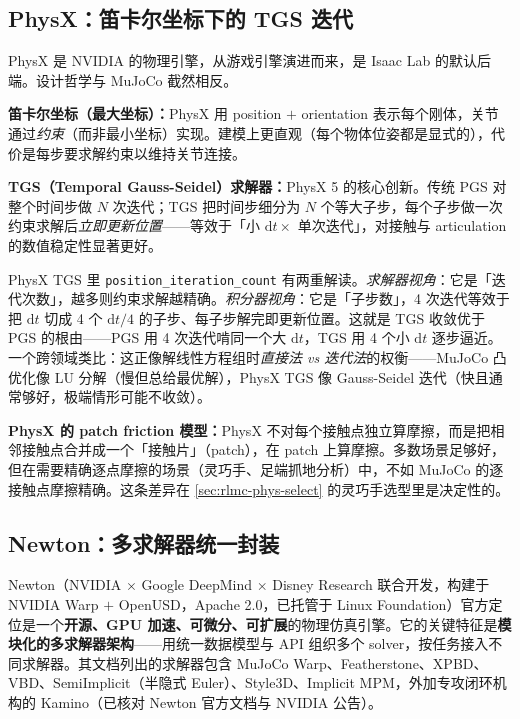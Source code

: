\subsection{PhysX：笛卡尔坐标下的 TGS 迭代}
\label{sec:rlmc-phys-physx}

PhysX 是 NVIDIA 的物理引擎，从游戏引擎演进而来，是 Isaac Lab 的默认后端。设计哲学与 MuJoCo 截然相反。

\textbf{笛卡尔坐标（最大坐标）：}PhysX 用 position $+$ orientation 表示每个刚体，关节通过\emph{约束}（而非最小坐标）实现。建模上更直观（每个物体位姿都是显式的），代价是每步要求解约束以维持关节连接。

\textbf{TGS（Temporal Gauss-Seidel）求解器：}PhysX 5 的核心创新。传统 PGS 对整个时间步做 $N$ 次迭代；TGS 把时间步细分为 $N$ 个等大子步，每个子步做一次约束求解后\emph{立即更新位置}——等效于「小 $\mathrm dt\times$ 单次迭代」，对接触与 articulation 的数值稳定性显著更好。

\begin{insight}\label{ins:rlmc-phys-tgs}
PhysX TGS 里 \verb|position_iteration_count| 有两重解读。\emph{求解器视角}：它是「迭代次数」，越多则约束求解越精确。\emph{积分器视角}：它是「子步数」，4 次迭代等效于把 $\mathrm dt$ 切成 4 个 $\mathrm dt/4$ 的子步、每子步解完即更新位置。这就是 TGS 收敛优于 PGS 的根由——PGS 用 4 次迭代啃同一个大 $\mathrm dt$，TGS 用 4 个小 $\mathrm dt$ 逐步逼近。一个跨领域类比：这正像解线性方程组时\emph{直接法 vs 迭代法}的权衡——MuJoCo 凸优化像 LU 分解（慢但总给最优解），PhysX TGS 像 Gauss-Seidel 迭代（快且通常够好，极端情形可能不收敛）。
\end{insight}

\textbf{PhysX 的 patch friction 模型：}PhysX 不对每个接触点独立算摩擦，而是把相邻接触点合并成一个「接触片」（patch），在 patch 上算摩擦。多数场景足够好，但在需要精确逐点摩擦的场景（灵巧手、足端抓地分析）中，不如 MuJoCo 的逐接触点摩擦精确。这条差异在 \cref{sec:rlmc-phys-select} 的灵巧手选型里是决定性的。

\subsection{Newton：多求解器统一封装}
\label{sec:rlmc-phys-newton}

Newton（NVIDIA $\times$ Google DeepMind $\times$ Disney Research 联合开发，构建于 NVIDIA Warp $+$ OpenUSD，Apache 2.0，已托管于 Linux Foundation）官方定位是一个\textbf{开源、GPU 加速、可微分、可扩展}的物理仿真引擎\cite{newton2026}。它的关键特征是\textbf{模块化的多求解器架构}——用统一数据模型与 API 组织多个 solver，按任务接入不同求解器。其文档列出的求解器包含 MuJoCo Warp、Featherstone、XPBD、VBD、SemiImplicit（半隐式 Euler）、Style3D、Implicit MPM，外加专攻闭环机构的 Kamino（已核对 Newton 官方文档与 NVIDIA 公告）。

